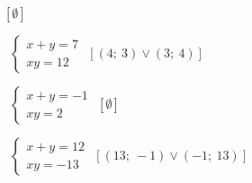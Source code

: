 \begin{esercizio}[\Ast]
\begin{multicols}{2}
\begin{enumeratea}
  \hfill\(\left[\emptyset\right]\)
 \item~\(\left\{\begin{array}{l}x+y=7\\{xy}=12 \end{array}\right.\)
  \hfill\(\left[(4;~3)\vee(3;~4)\right]\)
 \item~\(\left\{\begin{array}{l}x+y=-1\\{xy}=2 \end{array}\right.\)
  \hfill\(\left[\emptyset\right]\)
 \item~\(\left\{\begin{array}{l}x+y=12\\{xy}=-13 \end{array}\right.\)
  \hfill\(\left[(13;~-1)\vee(-1;~13)\right]\)
 \end{enumeratea}
 \end{multicols}
\end{esercizio}

